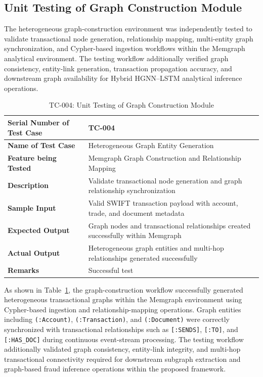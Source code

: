 \subsection[Unit Testing of Graph Construction Module]{\textbf{Unit Testing of Graph Construction Module}}

The heterogeneous graph-construction environment was independently tested to validate transactional node generation, relationship mapping, multi-entity graph synchronization, and Cypher-based ingestion workflows within the Memgraph analytical environment. The testing workflow additionally verified graph consistency, entity-link generation, transaction propagation accuracy, and downstream graph availability for Hybrid HGNN--LSTM analytical inference operations.

\begin{table}[H]
\centering
\caption{TC-004: Unit Testing of Graph Construction Module}
\label{tab:graph_construction_test}
\vspace{0.2cm}

\begin{tabular}{|p{4.2cm}|p{9cm}|}
\hline
\textbf{Serial Number of Test Case} & TC-004 \\ \hline
\textbf{Name of Test Case} & Heterogeneous Graph Entity Generation \\ \hline
\textbf{Feature being Tested} & Memgraph Graph Construction and Relationship Mapping \\ \hline
\textbf{Description} & Validate transactional node generation and graph relationship synchronization \\ \hline
\textbf{Sample Input} & Valid SWIFT transaction payload with account, trade, and document metadata \\ \hline
\textbf{Expected Output} & Graph nodes and transactional relationships created successfully within Memgraph \\ \hline
\textbf{Actual Output} & Heterogeneous graph entities and multi-hop relationships generated successfully \\ \hline
\textbf{Remarks} & Successful test \\ \hline
\end{tabular}
\end{table}

As shown in Table~\ref{tab:graph_construction_test}, the graph-construction workflow successfully generated heterogeneous transactional graphs within the Memgraph environment using Cypher-based ingestion and relationship-mapping operations. Graph entities including \texttt{(:Account)}, \texttt{(:Transaction)}, and \texttt{(:Document)} were correctly synchronized with transactional relationships such as \texttt{[:SENDS]}, \texttt{[:TO]}, and \texttt{[:HAS\_DOC]} during continuous event-stream processing. The testing workflow additionally validated graph consistency, entity-link integrity, and multi-hop transactional connectivity required for downstream subgraph extraction and graph-based fraud inference operations within the proposed framework.

